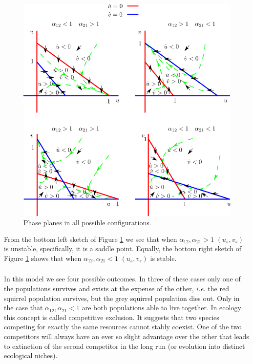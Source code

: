 \documentclass[]{article}
\newcommand{\fig}[1]{Figure \ref{#1}}
\newcommand{\ie}{\emph{i.e.} }
\newcommand{\tp}{\textwidth}
\begin{document}
\begin{Answ}
\subsubsection{}
\begin{figure}[h!!!tb]
\centering
\includegraphics[width=\tp]{../../Pictures/Competitive_exclusion.png}
\caption{Phase planes in all possible configurations.\label{Phase_plane}}
\end{figure}
From the bottom left sketch of \fig{Phase_plane} we see that when $\alpha_{12},\alpha_{21}>1$ $(u_s,v_s)$ is unstable, specifically, it is a saddle point. Equally, the bottom right sketch of \fig{Phase_plane} shows that when $\alpha_{12},\alpha_{21}<1$ $(u_s,v_s)$ is stable.
\subsubsection{}
In this model we see four possible outcomes. In three of these cases only one of the populations survives and exists at the expense of the other, \ie the red squirrel population survives, but the grey squirrel population dies out. Only in the case that $\alpha_{12},\alpha_{21}<1$ are both populations able to live together. In ecology this concept is called competitive exclusion. It suggests that two species competing for exactly the same resources cannot stably coexist. One of the two competitors will always have an ever so slight advantage over the other that leads to extinction of the second competitor in the long run (or evolution into distinct ecological niches).
\end{Answ}
\end{document}

